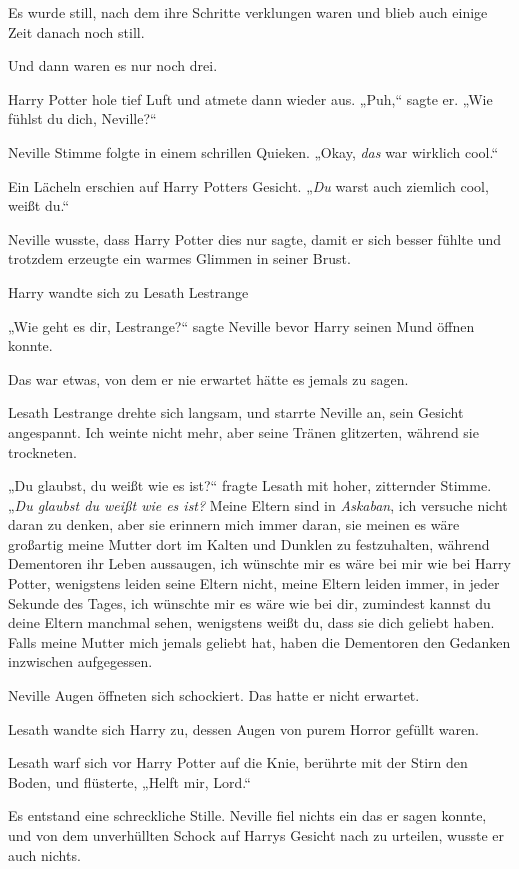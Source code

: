 {Es wurde still, nach dem ihre Schritte verklungen waren und blieb auch einige Zeit danach noch still.

Und dann waren es nur noch drei.

Harry Potter hole tief Luft und atmete dann wieder aus. „Puh,“ sagte er. „Wie fühlst du dich, Neville?“

Neville Stimme folgte in einem schrillen Quieken. „Okay, \emph{das} war wirklich cool.“

Ein Lächeln erschien auf Harry Potters Gesicht. „\emph{Du} warst auch ziemlich cool, weißt du.“

Neville wusste, dass Harry Potter dies nur sagte, damit er sich besser fühlte und trotzdem erzeugte ein warmes Glimmen in seiner Brust.

Harry wandte sich zu Lesath Lestrange \later

„Wie geht es dir, Lestrange?“ sagte Neville bevor Harry seinen Mund öffnen konnte.

Das war etwas, von dem er nie erwartet hätte es jemals zu sagen.

Lesath Lestrange drehte sich langsam, und starrte Neville an, sein Gesicht angespannt. Ich weinte nicht mehr, aber seine Tränen glitzerten, während sie trockneten.

„Du glaubst, du weißt wie es ist?“ fragte Lesath mit hoher, zitternder Stimme. „\emph{Du glaubst du weißt wie es ist?} Meine Eltern sind in \emph{Askaban}, ich versuche nicht daran zu denken, aber sie erinnern mich immer daran, sie meinen es wäre großartig meine Mutter dort im Kalten und Dunklen zu festzuhalten, während Dementoren ihr Leben aussaugen, ich wünschte mir es wäre bei mir wie bei Harry Potter, wenigstens leiden seine Eltern nicht, meine Eltern leiden immer, in jeder Sekunde des Tages, ich wünschte mir es wäre wie bei dir, zumindest kannst du deine Eltern manchmal sehen, wenigstens weißt du, dass sie dich geliebt haben. Falls meine Mutter mich jemals geliebt hat, haben die Dementoren den Gedanken inzwischen aufgegessen.

Neville Augen öffneten sich schockiert. Das hatte er nicht erwartet.

Lesath wandte sich Harry zu, dessen Augen von purem Horror gefüllt waren.

Lesath warf sich vor Harry Potter auf die Knie, berührte mit der Stirn den Boden, und flüsterte, „Helft mir, Lord.“

Es entstand eine schreckliche Stille. Neville fiel nichts ein das er sagen konnte, und von dem unverhüllten Schock auf Harrys Gesicht nach zu urteilen, wusste er auch nichts.

}
